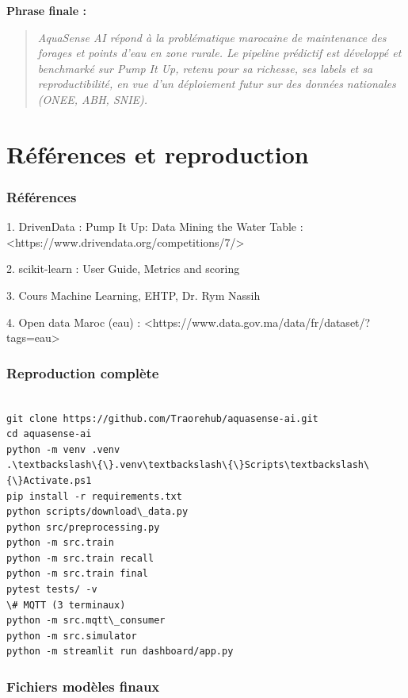 \documentclass[11pt,a4paper]{report}
\begin{document}
\textbf{Phrase finale :}

\begin{quote}

\textit{AquaSense AI répond à la problématique marocaine de maintenance des forages et points d'eau en zone rurale. Le pipeline prédictif est développé et benchmarké sur Pump It Up, retenu pour sa richesse, ses labels et sa reproductibilité, en vue d'un déploiement futur sur des données nationales (ONEE, ABH, SNIE).}

\end{quote}

\chapter{Références et reproduction}

\subsection{Références}

1. DrivenData : Pump It Up: Data Mining the Water Table : <https://www.drivendata.org/competitions/7/>

2. scikit-learn : User Guide, Metrics and scoring

3. Cours Machine Learning, EHTP, Dr. Rym Nassih

4. Open data Maroc (eau) : <https://www.data.gov.ma/data/fr/dataset/?tags=eau>

\subsection{Reproduction complète}

\begin{lstlisting}

git clone https://github.com/Traorehub/aquasense-ai.git
cd aquasense-ai
python -m venv .venv
.\textbackslash\{\}.venv\textbackslash\{\}Scripts\textbackslash\{\}Activate.ps1
pip install -r requirements.txt
python scripts/download\_data.py
python src/preprocessing.py
python -m src.train
python -m src.train recall
python -m src.train final
pytest tests/ -v
\# MQTT (3 terminaux)
python -m src.mqtt\_consumer
python -m src.simulator
python -m streamlit run dashboard/app.py

\end{lstlisting}

\subsection{Fichiers modèles finaux}
\end{document}

